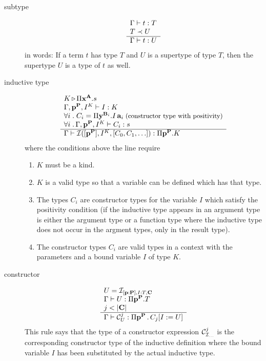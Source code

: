 \begin{definition}
\begin{description}
  \item[subtype]
    $$
    \begin{array}{l} \Gamma \vdash t : T
      \\
      T \prec U
     \\ \hline \Gamma \vdash t: U\end{array}
    $$
    in words: If a term $t$ has type $T$ and $U$ is a supertype of type $T$,
    then the supertype $U$ is a type of $t$ as well.

  \item[inductive type]
    $$
    \begin{array}{l}  K {\,\triangleright\,} \Pi \mathbf{x}^{\mathbf{A}}.s
      \\
      \Gamma, \mathbf{p}^{\mathbf{P}}, I^K \vdash I : K
      \\
      \forall i\;.\; C_i = \Pi \mathbf{y}^{\mathbf{B}_i}. I \, \mathbf{a}_i
      \;\text{\small(constructor type with positivity)}
      \\
      \forall i\;.\, \Gamma, \mathbf{p}^{\mathbf{P}}, I^K
      \vdash
      C_i : s
     \\ \hline 
      \Gamma
      \vdash
      {\cal I } ([\mathbf{p}^{\mathbf{P}}], I^K, [C_0,C_1,\ldots])
      :
      \Pi \mathbf{p}^{\mathbf{P}}. K
    \end{array}
    $$
    where the conditions above the line require
    \begin{enumerate}
    \item $K$ must be a kind.

    \item $K$ is a valid type so that a
      variable can be defined which has that type.

    \item The types $C_i$ are constructor types for the variable $I$ which
      satisfy the positivity condition (if the inductive
      type appears in an argument type is either the argument type or a
      function type where the inductive type does not occur in the argment
      types, only in the result type).

    \item The constructor types $C_i$ are valid types in a context with the
      parameters and a bound variable $I$ of type $K$.
    \end{enumerate}


  \item[constructor]
    $$
    \begin{array}{l} 
      U = {\cal I }_{[\mathbf{p}:\mathbf{P}], I:T, \mathbf{C}}
      \\
      \Gamma
      \vdash
      U
      :
      \Pi \mathbf{p}^{\mathbf{P}}.T
      \\
      j < |\mathbf{C}|
     \\ \hline 
      \Gamma \vdash
      {\cal C}^j_U
      :
      \Pi \mathbf{p}^{\mathbf{P}} \,.\, C_j[I := U]
    \end{array}
    $$
    This rule says that the type of a constructor expression
    ${\cal C}^j_{{\cal I }_{\ldots}}$ is the corresponding constructor type
    of the inductive definition where the bound variable $I$ has been
    substituted by the actual inductive type.



\end{description}
\end{definition}
